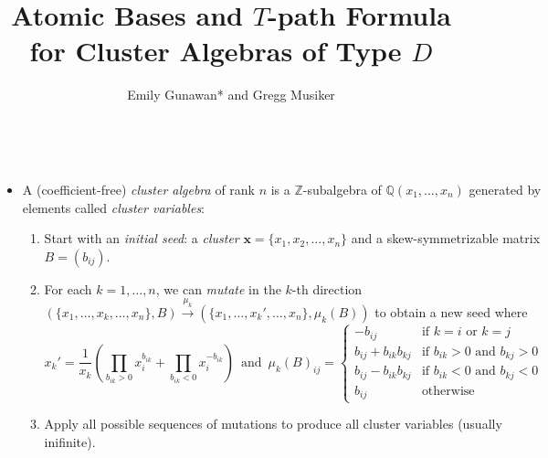 \documentclass[a0paper, portrait, 17pt]{tikzposter}
\title{Atomic Bases and $T$-path Formula for Cluster Algebras of Type $D$} \author{Emily Gunawan* and Gregg Musiker}
\institute{University of Minnesota, School of Mathematics, Minneapolis, USA}
\begin{document}
 \maketitle
\begin{columns}
%

 {
\begin{itemize}

\item 
A (coefficient-free) \emph{cluster algebra}  of rank $n$  is a $\mathbb{Z}$-subalgebra of $\mathbb{Q}(x_1, \dots, x_n)$
generated by elements called \emph{cluster variables}:

\begin{enumerate}[-]
\item Start with an \emph{initial seed}: a \emph{cluster} $\mathbf{x}=\{ x_1, x_2, \dots, x_n\}$
and a skew-symmetrizable matrix $B=(b_{ij})$.
\item For each $k=1,\dots,n$, we can \emph{mutate} in the $k$-th direction
$\left( \{ x_1, \dots, {x_k}, \dots, x_n\},B \right) \overset{\mu_k}{\longrightarrow} 
\left( \{ x_1, \dots, {x_k'}, \dots, x_n\}, \mu_k(B) \right)$
to obtain a new seed
where 
\[x_k' =\frac{1}{x_k}\left( {\prod_{b_{ik}>0} x_i^{b_{ik}} + \prod_{b_{ik}<0} x_i^{-b_{ik}}}\right)
\, \text{ and }\, \mu_k(B)_{ij}=
 \begin{cases}
 - b_{ij}&\text{if $k=i$ or $k=j$} \\
b_{ij} + b_{ik}b_{kj} &\text{if $b_{ik}>0$ and $b_{kj}>0$}\\
b_{ij} - b_{ik}b_{kj} &\text{if $b_{ik}<0$ and $b_{kj}<0$}\\
b_{ij} &\text{otherwise}
\end{cases}\]
\item Apply all possible sequences of mutations to produce all cluster variables (usually inifinite).
\end{enumerate}

%
%
\end{itemize}

}
\end{columns}
\end{document}
